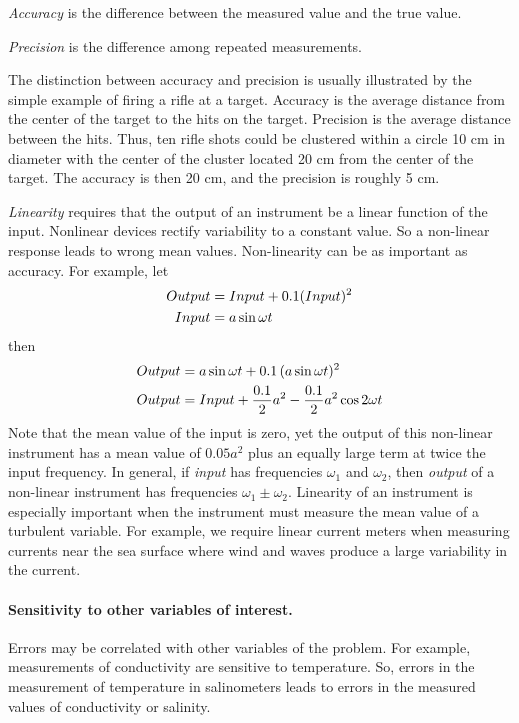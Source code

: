 \textit{Accuracy} is the difference between the measured value and the true value.

\textit{Precision}  is the difference among repeated measurements.

The distinction between accuracy and precision is usually illustrated by the
simple example of firing a rifle at a target. Accuracy is the average distance
from the center of the target to the hits on the target. Precision is the average
distance between the hits. Thus, ten rifle shots could be clustered within a
circle 10 cm in diameter with the center of the cluster located 20 cm from the
center of the target. The accuracy is then 20 cm, and the precision is roughly 5
cm.

\textit{Linearity} requires that the output of an instrument be a linear function
of the input. Nonlinear devices rectify variability to a constant value. So a non-linear
response leads to wrong mean values. Non-linearity can be as important as accuracy.
For example, let
\begin{align}
Output &= Input + 0.1(Input)^2 \notag \\
Input &= a \sin \omega t \notag
\end{align}
then
\begin{align}
Output &= a \sin \omega t + 0.1\,(a \sin \omega t)^2 \notag \\
Output &= Input + \frac{0.1}{2} a^2 - \frac{0.1}{2} a^2 \cos 2\omega t
\notag
\end{align}
Note that the mean value of the input is zero, yet the output of this non-linear
instrument has a mean value of \(0.05 a^2\) plus an equally large term at
twice the input frequency. In general, if \textit{input} has frequencies
\(\omega_1\) and
\(\omega_2\), then \textit{output} of a non-linear instrument has frequencies
\(\omega_1
\pm
\omega_2\). Linearity of an instrument is especially important when the
instrument must measure the mean value of a turbulent variable. For example, we
require linear current meters when measuring currents near the sea surface where
wind and waves produce a large variability in the current.

\paragraph{Sensitivity to other variables of interest.}
Errors may be correlated with other variables of the problem. For example,
measurements of conductivity are sensitive to temperature. So, errors in
the measurement of temperature in salinometers leads to errors in the
measured values of conductivity or salinity.

